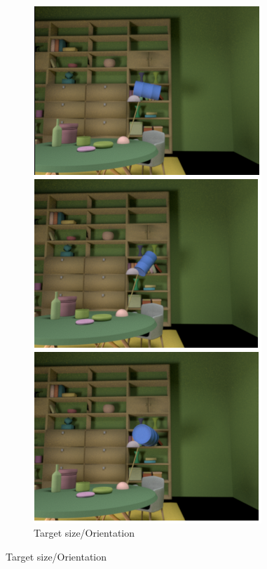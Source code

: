 \documentclass{jov}
\begin{document}
\begin{figure}
\begin{subfigure}[b]{0.18 \textwidth}
        \label{fig:targetPositionVariation}
    \end{subfigure}
    ~
	\begin{subfigure}[b]{0.18 \textwidth}
    \centering
        \caption{Target size/Orientation}
        \includegraphics[width=\textwidth]{../FiguresDraft5/Figure4/Figure4_e.png}

\end{subfigure}
\end{figure}
\end{document}
